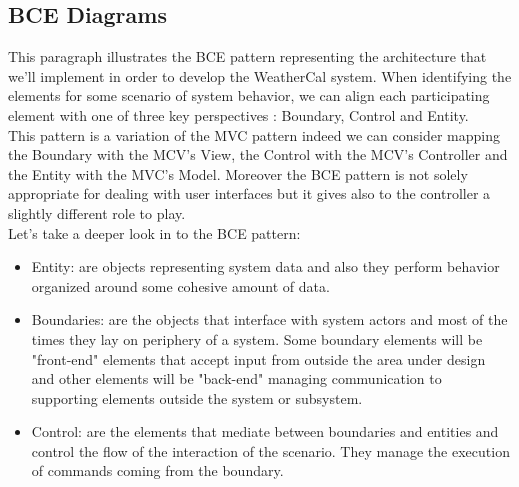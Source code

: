 \subsection{BCE Diagrams}
This paragraph illustrates the BCE pattern representing the architecture that we'll implement in order to develop the WeatherCal system. When identifying the elements for some scenario of system behavior, we can align each participating element with one of three key perspectives : Boundary, Control and Entity. \\This  pattern is a variation of the MVC pattern indeed we can consider mapping the Boundary with the MCV's View, the Control with the MCV's Controller and the Entity with the MVC's Model. Moreover the BCE pattern is not solely appropriate for dealing with user interfaces but it gives also to the controller a slightly different role to play.\\Let's take a deeper look in to the BCE pattern:\begin{itemize}
\item Entity: are objects representing system data and also they perform behavior organized around some cohesive amount of data.
\item Boundaries: are the objects that interface with system actors and most of the times they lay on periphery of a system. Some boundary elements will be "front-end" elements that accept input from outside the area under design and other elements will be "back-end" managing communication to supporting elements outside the system or subsystem.
\item Control: are the elements that mediate between boundaries and entities and control the flow of the interaction of the scenario. They manage the execution of commands coming from the boundary.

\end{itemize}
